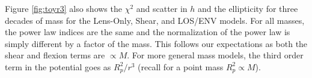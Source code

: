 Figure \ref{fig:toyr3} also shows the $\chi^2$ and scatter in $h$ and the ellipticity for three decades of mass for the Lens-Only, Shear, and LOS/ENV models. For all masses, the power law indices are the same and the normalization of the power law is simply different by a factor of the mass. This follows our expectations as both the shear and flexion terms are $\propto M$. For more general mass models, the third order term in the potential goes as $R_p^2/r^3$ (recall for a point mass $R_p^2 \propto M$).